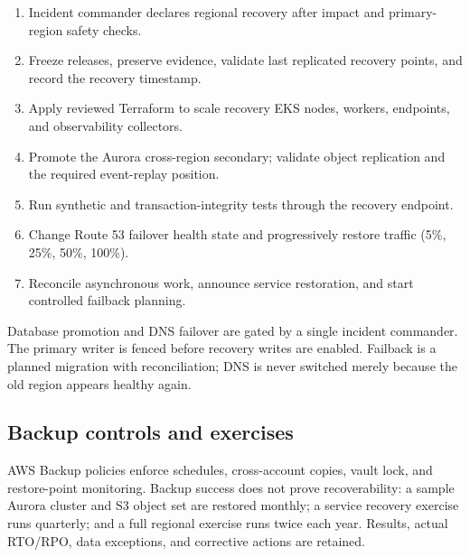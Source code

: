 \begin{enumerate}
  \item Incident commander declares regional recovery after impact and primary-region safety checks.
  \item Freeze releases, preserve evidence, validate last replicated recovery points, and record the recovery timestamp.
  \item Apply reviewed Terraform to scale recovery EKS nodes, workers, endpoints, and observability collectors.
  \item Promote the Aurora cross-region secondary; validate object replication and the required event-replay position.
  \item Run synthetic and transaction-integrity tests through the recovery endpoint.
  \item Change Route 53 failover health state and progressively restore traffic (5\%, 25\%, 50\%, 100\%).
  \item Reconcile asynchronous work, announce service restoration, and start controlled failback planning.
\end{enumerate}

\begin{riskbox}
Database promotion and DNS failover are gated by a single incident commander. The primary writer is fenced before recovery writes are enabled. Failback is a planned migration with reconciliation; DNS is never switched merely because the old region appears healthy again.
\end{riskbox}

\subsection{Backup controls and exercises}

AWS Backup policies enforce schedules, cross-account copies, vault lock, and restore-point monitoring. Backup success does not prove recoverability: a sample Aurora cluster and S3 object set are restored monthly; a service recovery exercise runs quarterly; and a full regional exercise runs twice each year. Results, actual RTO/RPO, data exceptions, and corrective actions are retained.

